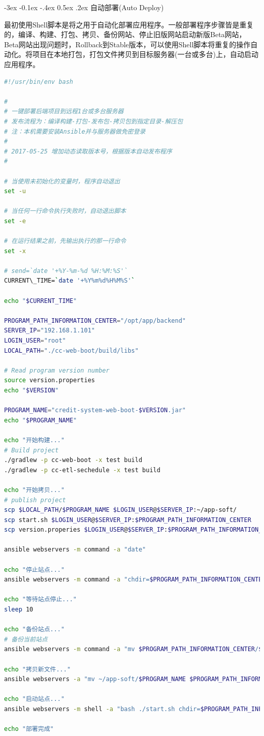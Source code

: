 \documentclass[12pt]{book}
\makeatletter
\numberwithin{dummy}{section}
\theoremstyle{ocrenumbox}
\theoremstyle{blacknumex}
\theoremstyle{blacknumbox}
\theoremstyle{ocrenum}
\renewcommand{\subsection}{\@startsection {subsection}{2}{\z@}
	{-3ex \@plus -0.1ex \@minus -.4ex}
	{0.5ex \@plus.2ex }
	{\normalfont\sffamily\bfseries}}
\makeatother
\begin{document}
\subsection{自动部署(Auto Deploy)}

最初使用Shell脚本是将之用于自动化部署应用程序。一般部署程序步骤皆是重复的，编译、构建、打包、拷贝、备份网站、停止旧版网站启动新版Beta网站，Beta网站出现问题时，Rollback到Stable版本，可以使用Shell脚本将重复的操作自动化。将项目在本地打包，打包文件拷贝到目标服务器(一台或多台)上，自动启动应用程序。

\begin{lstlisting}[language=Bash]
#!/usr/bin/env bash

#
# 一键部署后端项目到远程1台或多台服务器
# 发布流程为：编译构建-打包-发布包-拷贝包到指定目录-解压包
# 注：本机需要安装Ansible并与服务器做免密登录
#
# 2017-05-25 增加动态读取版本号，根据版本自动发布程序
#

# 当使用未初始化的变量时，程序自动退出
set -u

# 当任何一行命令执行失败时，自动退出脚本
set -e

# 在运行结果之前，先输出执行的那一行命令
set -x

# send=`date '+%Y-%m-%d %H:%M:%S'`
CURRENT\_TIME=`date '+%Y%m%d%H%M%S'`

echo "$CURRENT_TIME"

PROGRAM_PATH_INFORMATION_CENTER="/opt/app/backend"
SERVER_IP="192.168.1.101"
LOGIN_USER="root"
LOCAL_PATH="./cc-web-boot/build/libs"

# Read program version number
source version.properties
echo "$VERSION"

PROGRAM_NAME="credit-system-web-boot-$VERSION.jar"
echo "$PROGRAM_NAME"

echo "开始构建..."
# Build project
./gradlew -p cc-web-boot -x test build
./gradlew -p cc-etl-sechedule -x test build

echo "开始拷贝..."
# publish project
scp $LOCAL_PATH/$PROGRAM_NAME $LOGIN_USER@$SERVER_IP:~/app-soft/
scp start.sh $LOGIN_USER@$SERVER_IP:$PROGRAM_PATH_INFORMATION_CENTER
scp version.properies $LOGIN_USER@$SERVER_IP:$PROGRAM_PATH_INFORMATION_CENTER

ansible webservers -m command -a "date"

echo "停止站点..."
ansible webservers -m command -a "chdir=$PROGRAM_PATH_INFORMATION_CENTER bash ./stop.sh"

echo "等待站点停止..."
sleep 10

echo "备份站点..."
# 备份当前站点
ansible webservers -m command -a "mv $PROGRAM_PATH_INFORMATION_CENTER/$PROGRAM_NAME $PROGRAM_PATH_INFORMATION_CENTER/$PROGRAM_NAME-$CURRENT_TIME"

echo "拷贝新文件..."
ansible webservers -a "mv ~/app-soft/$PROGRAM_NAME $PROGRAM_PATH_INFORMATION_CENTER"

echo "启动站点..."
ansible webservers -m shell -a "bash ./start.sh chdir=$PROGRAM_PATH_INFORMATION_CENTER"

echo "部署完成"
\end{lstlisting}
\end{document}
